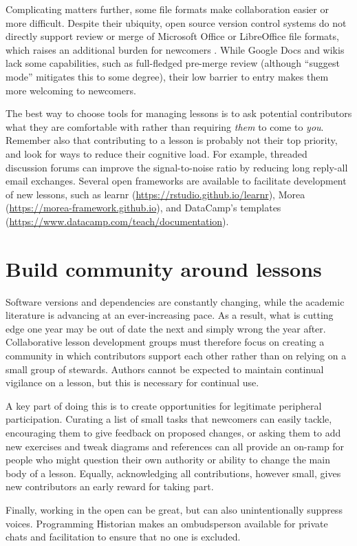 \documentclass[10pt,letterpaper]{article}
\newcommand{\rulemajor}[2]{\section{#1}\label{#2}}
\begin{document}
Complicating matters further,
some file formats make collaboration easier or more difficult.
Despite their ubiquity,
open source version control systems do not directly support review or merge
of Microsoft Office or LibreOffice file formats,
which raises an additional burden for newcomers \cite{jacobs}.
While Google Docs and wikis lack some capabilities, such as
full-fledged pre-merge review (although ``suggest mode'' 
mitigates this to some degree), 
their low barrier to entry makes them more welcoming to newcomers.

The best way to choose tools for managing lessons is
to ask potential contributors what they are comfortable with
rather than requiring \emph{them} to come to \emph{you}.
Remember also that contributing to a lesson is probably not their top priority,
and look for ways to reduce their cognitive load.
For example,
threaded discussion forums can improve the signal-to-noise ratio
by reducing long reply-all email exchanges.
Several open frameworks are available to facilitate development of new lessons,
such as learnr (\url{https://rstudio.github.io/learnr}),
Morea (\url{https://morea-framework.github.io}),
and DataCamp's templates (\url{https://www.datacamp.com/teach/documentation}).

\rulemajor{Build community around lessons}{community}

Software versions and dependencies are constantly changing,
while the academic literature is advancing at an ever-increasing pace.
As a result,
what is cutting edge one year may be out of date the next and simply wrong the year after.
Collaborative lesson development groups must therefore focus
on creating a community in which contributors support each other
rather than on relying on a small group of stewards.
Authors cannot be expected to maintain continual vigilance on a lesson,
but this is necessary for continual use.

A key part of doing this is to create opportunities for legitimate peripheral participation.
Curating a list of small tasks that newcomers can easily tackle,
encouraging them to give feedback on proposed changes,
or asking them to add new exercises and tweak diagrams and references
can all provide an on-ramp for people who might question their own authority or ability to change the main body of a lesson.
Equally,
acknowledging all contributions,
however small,
gives new contributors an early reward for taking part. 

Finally,
working in the open can be great,
but can also unintentionally suppress voices.
Programming Historian makes an ombudsperson available for private chats and facilitation
to ensure that no one is excluded.
\end{document}
